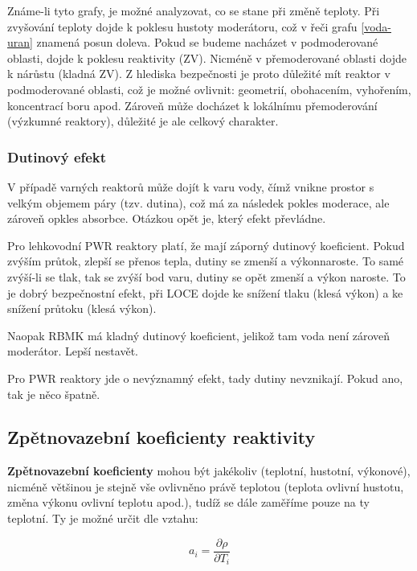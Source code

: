 Známe-li tyto grafy, je možné analyzovat, co se stane při změně teploty. Při zvyšování teploty dojde k poklesu hustoty moderátoru, což v řeči grafu \ref{voda-uran} znamená posun doleva. Pokud se budeme nacházet v podmoderované oblasti, dojde k poklesu reaktivity (ZV). Nicméně v přemoderované oblasti dojde k nárůstu (kladná ZV). Z hlediska bezpečnosti je proto důležité mít reaktor v podmoderované oblasti, což je možné ovlivnit: geometrií, obohacením, vyhořením, koncentrací boru apod. Zároveň může docházet k lokálnímu přemoderování (výzkumné reaktory), důležité je ale celkový charakter.

\subsubsection{Dutinový efekt}

V případě varných reaktorů může dojít k varu vody, čímž vnikne prostor s velkým objemem páry (tzv. dutina), což má za následek pokles moderace, ale zároveň opkles absorbce. Otázkou opět je, který efekt převládne.

Pro lehkovodní PWR reaktory platí, že mají záporný dutinový koeficient. Pokud zvýším průtok, zlepší se přenos tepla, dutiny se zmenší a výkonnaroste. To samé zvýší-li se tlak, tak se zvýší bod varu, dutiny se opět zmenší a výkon naroste. To je dobrý bezpečnostní efekt, při LOCE dojde ke snížení tlaku (klesá výkon) a ke snížení průtoku (klesá výkon).

Naopak RBMK má kladný dutinový koeficient, jelikož tam voda není zároveň moderátor. Lepší nestavět.

Pro PWR reaktory jde o nevýznamný efekt, tady dutiny nevznikají. Pokud ano, tak je něco špatně.

\subsection{Zpětnovazební koeficienty reaktivity}

\textbf{Zpětnovazební koeficienty} mohou být jakékoliv (teplotní, hustotní, výkonové), nicméně většinou je stejně vše ovlivněno právě teplotou (teplota ovlivní hustotu, změna výkonu ovlivní teplotu apod.), tudíž se dále zaměříme pouze na ty teplotní. Ty je možné určit dle vztahu:

\begin{equation}
  \boxed{
  a_i = \dfrac{\partial \rho}{\partial T_i}
  \label{zpetnovazebni_koeficient_definice}
  }
\end{equation}

